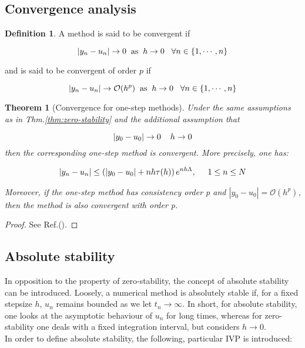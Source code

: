 \documentclass[11pt]{article}
\theoremstyle{theorem}
\newtheorem{theorem}{Theorem}
\theoremstyle{definition}
\newtheorem{definition}{Definition}
\begin{document}
\subsection{Convergence analysis}
\begin{definition}
	\label{def:convergence}
	A method is said to be convergent if 
	
	$$|y_n-u_n|\rightarrow 0\hspace{2mm}\text{as}\hspace{2mm}h\rightarrow 0\hspace{3mm}\forall n\in\lbrace 1,\cdots, n\rbrace$$
	
	and is said to be convergent of order $p$ if 
	
	
	$$|y_n-u_n|\rightarrow \mathcal{O}(h^p)\hspace{2mm}\text{as}\hspace{2mm}h\rightarrow 0\hspace{3mm}\forall n\in\lbrace 1,\cdots, n\rbrace$$
\end{definition}

\begin{theorem}[Convergence for one-step methods]
	\label{thm:convergence-one-step}
	Under the same assumptions as in Thm.\ref{thm:zero-stability} and the additional assumption that 
	
	$$|y_0-u_0|\rightarrow 0\hspace{4mm}h\rightarrow 0$$
    then the corresponding one-step method is convergent. More precisely, one has:
    
    \begin{align}
    	\label{eqn:convergence-one-step}
    	|y_n-u_n|\le\left(|y_0-u_0|+nh\tau (h)\right)e^{nh\Lambda},\hspace{5mm}1\le n\le N
    \end{align}
    
    Moreover, if the one-step method has consistency order p and $|y_0-u_0|=\mathcal{O}(h^p)$, then the method is also convergent with order p.\\
\end{theorem}

\begin{proof}
	See Ref.(\cite{lec-notes}).
\end{proof}

\subsection{Absolute stability}
In opposition to the property of zero-stability, the concept of absolute stability can be introduced. Loosely, a numerical method is absolutely stable if, for a fixed stepsize
$h$, $u_n$ remains bounded as we let $t_n\rightarrow\infty$. In short, for absolute stability, one looks at the asymptotic behaviour of $u_n$ for long times, whereas for zero-stability one deals with a fixed integration interval, but considers $h\rightarrow 0$.\\
In order to define absolute stability, the following, particular IVP is introduced: 
\end{document}
